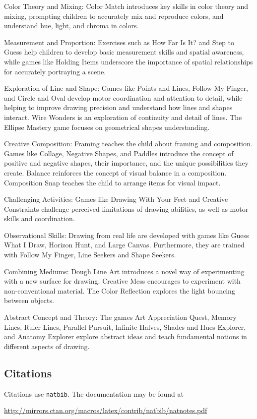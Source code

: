 \documentclass{article}
\begin{document}
Color Theory and Mixing: Color Match introduces key skills in color theory and mixing, prompting children to accurately mix and reproduce colors, and understand hue, light, and chroma in colors.

Measurement and Proportion: Exercises such as How Far Is It? and Step to Guess help children to develop basic measurement skills and spatial awareness, while games like Holding Items underscore the importance of spatial relationships for accurately portraying a scene.

Exploration of Line and Shape: Games like Points and Lines, Follow My Finger, and Circle and Oval develop motor coordination and attention to detail, while helping to improve drawing precision and understand how lines and shapes interact. Wire Wonders is an exploration of continuity and detail of lines. The Ellipse Mastery game focuses on geometrical shapes understanding.

Creative Composition: Framing teaches the child about framing and composition. Games like Collage, Negative Shapes, and Paddles introduce the concept of positive and negative shapes, their importance, and the unique possibilities they create. Balance reinforces the concept of visual balance in a composition. Composition Snap teaches the child to arrange items for visual impact.

Challenging Activities: Games like Drawing With Your Feet and Creative Constraints challenge perceived limitations of drawing abilities, as well as motor skills and coordination.

Observational Skills: Drawing from real life are developed with games like Guess What I Draw, Horizon Hunt, and Large Canvas. Furthermore, they are trained with Follow My Finger, Line Seekers and Shape Seekers.

Combining Mediums: Dough Line Art introduces a novel way of experimenting with a new surface for drawing. Creative Mess encourages to experiment with non-conventional material. The Color Reflection explores the light bouncing between objects.

Abstract Concept and Theory: The games Art Appreciation Quest, Memory Lines, Ruler Lines, Parallel Pursuit, Infinite Halves, Shades and Hues Explorer, and Anatomy Explorer explore abstract ideas and teach fundamental notions in different aspects of drawing.

\subsection{Citations}
Citations use \verb+natbib+. The documentation may be found at
\begin{center}
	\url{http://mirrors.ctan.org/macros/latex/contrib/natbib/natnotes.pdf}
\end{center}
\end{document}
